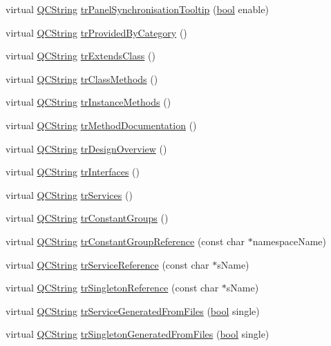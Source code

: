 \begin{DoxyCompactItemize}
\item 
virtual \hyperlink{class_q_c_string}{Q\+C\+String} \hyperlink{class_translator_czech_affd4bfc31138706a4ae0740d047227c7}{tr\+Panel\+Synchronisation\+Tooltip} (\hyperlink{qglobal_8h_a1062901a7428fdd9c7f180f5e01ea056}{bool} enable)
\item 
virtual \hyperlink{class_q_c_string}{Q\+C\+String} \hyperlink{class_translator_czech_a46c6132e9e24796f3443864f8ab883dc}{tr\+Provided\+By\+Category} ()
\item 
virtual \hyperlink{class_q_c_string}{Q\+C\+String} \hyperlink{class_translator_czech_ad43714f03c8afe7e3095394a9e0be8e4}{tr\+Extends\+Class} ()
\item 
virtual \hyperlink{class_q_c_string}{Q\+C\+String} \hyperlink{class_translator_czech_ab5237ede416d7c005951eb006e57035d}{tr\+Class\+Methods} ()
\item 
virtual \hyperlink{class_q_c_string}{Q\+C\+String} \hyperlink{class_translator_czech_a0bea8191ff76ae1dc265d1762a0c812f}{tr\+Instance\+Methods} ()
\item 
virtual \hyperlink{class_q_c_string}{Q\+C\+String} \hyperlink{class_translator_czech_a7eed62b280db41321834f3561c1025d8}{tr\+Method\+Documentation} ()
\item 
virtual \hyperlink{class_q_c_string}{Q\+C\+String} \hyperlink{class_translator_czech_aa11e4e648a2d095672308cd8c6f0f161}{tr\+Design\+Overview} ()
\item 
virtual \hyperlink{class_q_c_string}{Q\+C\+String} \hyperlink{class_translator_czech_af53f52a773c2e783a9b176cbf7132781}{tr\+Interfaces} ()
\item 
virtual \hyperlink{class_q_c_string}{Q\+C\+String} \hyperlink{class_translator_czech_afa1c7b06166b3b37e17e2b050e51e811}{tr\+Services} ()
\item 
virtual \hyperlink{class_q_c_string}{Q\+C\+String} \hyperlink{class_translator_czech_a2867d4779cd8a9c86eb592ea8373063c}{tr\+Constant\+Groups} ()
\item 
virtual \hyperlink{class_q_c_string}{Q\+C\+String} \hyperlink{class_translator_czech_a98f04e9b3a3abd710fd36bd280ee2882}{tr\+Constant\+Group\+Reference} (const char $\ast$namespace\+Name)
\item 
virtual \hyperlink{class_q_c_string}{Q\+C\+String} \hyperlink{class_translator_czech_a3506cc838ca852d88ce584d6005d5c5e}{tr\+Service\+Reference} (const char $\ast$s\+Name)
\item 
virtual \hyperlink{class_q_c_string}{Q\+C\+String} \hyperlink{class_translator_czech_a976ecfab48ca3c52f18d7d0736d3d8b1}{tr\+Singleton\+Reference} (const char $\ast$s\+Name)
\item 
virtual \hyperlink{class_q_c_string}{Q\+C\+String} \hyperlink{class_translator_czech_ae948f0820bce650419e4770080f5ee9b}{tr\+Service\+Generated\+From\+Files} (\hyperlink{qglobal_8h_a1062901a7428fdd9c7f180f5e01ea056}{bool} single)
\item 
virtual \hyperlink{class_q_c_string}{Q\+C\+String} \hyperlink{class_translator_czech_ad3a3896e272c126e340014c82e796830}{tr\+Singleton\+Generated\+From\+Files} (\hyperlink{qglobal_8h_a1062901a7428fdd9c7f180f5e01ea056}{bool} single)
\end{DoxyCompactItemize}


